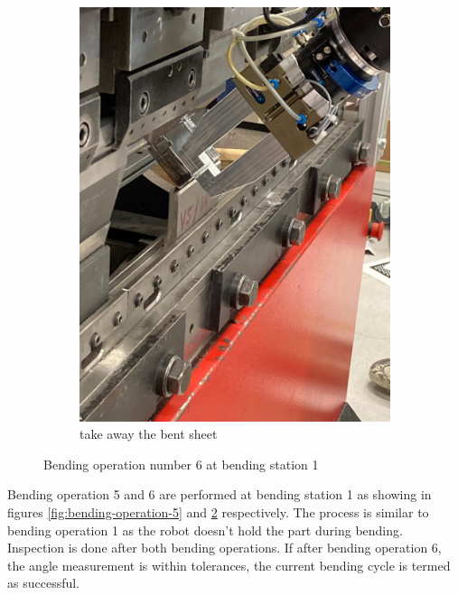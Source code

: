 \begin{figure}[h]
\begin{subfigure}[b]{0.32\textwidth}
        \includegraphics[width=\textwidth]{figures/bending/bending6-002.png}
        \caption{take away the bent sheet}
        \label{subfig:bending6-after}
    \end{subfigure}\hspace{0.1cm}
    \caption{Bending operation number 6 at bending station 1}
    \label{fig:bending-operation-6}
\end{figure}

Bending operation 5 and 6 are performed at bending station 1 as showing in figures \ref{fig:bending-operation-5} and \ref{fig:bending-operation-6} respectively. The process is similar to bending operation 1 as the robot doesn't hold the part during bending. Inspection is done after both bending operations. If after bending operation 6, the angle measurement is within tolerances, the current bending cycle is termed as successful.